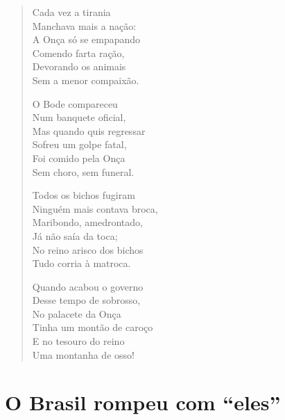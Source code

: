 \begin{verse}
Cada vez a tirania\\
Manchava mais a nação:\\
A Onça só se empapando\\
Comendo farta ração,\\
Devorando os animais\\
Sem a menor compaixão.

O Bode compareceu\\
Num banquete oficial,\\
Mas quando quis regressar\\
Sofreu um golpe fatal,\\
Foi comido pela Onça\\
Sem choro, sem funeral.


Todos os bichos fugiram\\
Ninguém mais contava broca,\\
Maribondo, amedrontado,\\
Já não saía da toca;\\
No reino arisco dos bichos\\
Tudo corria à matroca.

Quando acabou o governo\\
Desse tempo de sobrosso,\\
No palacete da Onça\\
Tinha um montão de caroço\\
E no tesouro do reino\\
Uma montanha de osso!
\end{verse}

\chapter{O Brasil rompeu com “eles”}

